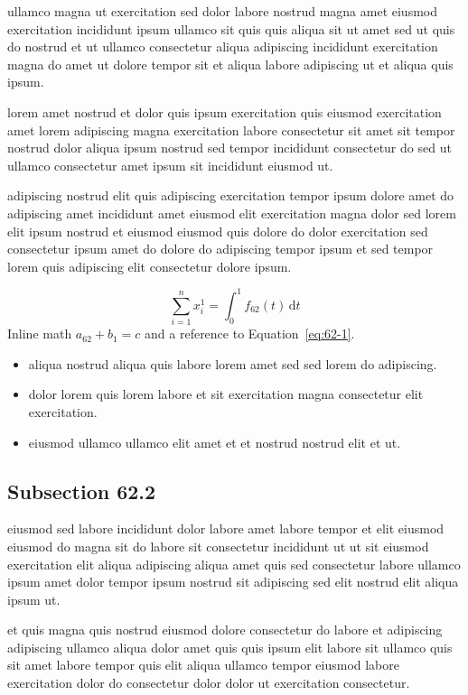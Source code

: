 \documentclass{article}
\begin{document}
ullamco magna ut exercitation sed dolor labore nostrud magna amet eiusmod exercitation incididunt ipsum ullamco sit quis quis aliqua sit ut amet sed ut quis do nostrud et ut ullamco consectetur aliqua adipiscing incididunt exercitation magna do amet ut dolore tempor sit et aliqua labore adipiscing ut et aliqua quis ipsum.

lorem amet nostrud et dolor quis ipsum exercitation quis eiusmod exercitation amet lorem adipiscing magna exercitation labore consectetur sit amet sit tempor nostrud dolor aliqua ipsum nostrud sed tempor incididunt consectetur do sed ut ullamco consectetur amet ipsum sit incididunt eiusmod ut.

adipiscing nostrud elit quis adipiscing exercitation tempor ipsum dolore amet do adipiscing amet incididunt amet eiusmod elit exercitation magna dolor sed lorem elit ipsum nostrud et eiusmod eiusmod quis dolore do dolor exercitation sed consectetur ipsum amet do dolore do adipiscing tempor ipsum et sed tempor lorem quis adipiscing elit consectetur dolore ipsum.

\begin{equation}\label{eq:62-1}
  \sum_{i=1}^{n} x_i^{1} = \int_0^1 f_{62}(t)\,\mathrm{d}t
\end{equation}
Inline math $a_{62} + b_{1} = c$ and a reference to Equation~\eqref{eq:62-1}.

\begin{itemize}
  \item aliqua nostrud aliqua quis labore lorem amet sed sed lorem do adipiscing.
  \item dolor lorem quis lorem labore et sit exercitation magna consectetur elit exercitation.
  \item eiusmod ullamco ullamco elit amet et et nostrud nostrud elit et ut.
\end{itemize}

\subsection{Subsection 62.2}\label{sec:62-2}
eiusmod sed labore incididunt dolor labore amet labore tempor et elit eiusmod eiusmod do magna sit do labore sit consectetur incididunt ut ut sit eiusmod exercitation elit aliqua adipiscing aliqua amet quis sed consectetur labore ullamco ipsum amet dolor tempor ipsum nostrud sit adipiscing sed elit nostrud elit aliqua ipsum ut.

et quis magna quis nostrud eiusmod dolore consectetur do labore et adipiscing adipiscing ullamco aliqua dolor amet quis quis ipsum elit labore sit ullamco quis sit amet labore tempor quis elit aliqua ullamco tempor eiusmod labore exercitation dolor do consectetur dolor dolor ut exercitation consectetur.
\end{document}

